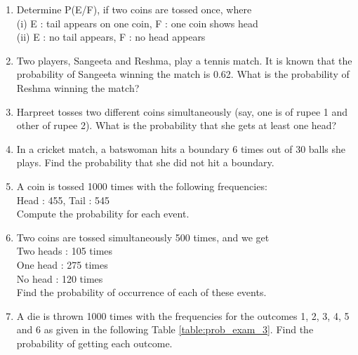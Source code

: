 \begin{enumerate}[label=\thesection.\arabic*.,ref=\thesection.\theenumi]
\item Determine P(E/F), if two coins are tossed once, where\\
(i) E : tail appears on one coin, F : one coin shows head\\
(ii) E : no tail appears, F : no head appears\\
\item Two players, Sangeeta and Reshma, play a tennis match. It is known
that the probability of Sangeeta winning the match is 0.62. What is the probability of
Reshma winning the match?
\item Harpreet tosses two different coins simultaneously (say, one is of rupee 1
and other of rupee 2). What is the probability that she gets at least one head?

	\item In a cricket match, a batswoman hits a boundary 6 times out of 30 balls she plays. Find the probability that she did not hit a boundary.
\\
\solution

	\item A coin is tossed 1000 times with the following frequencies:\\
Head : 455, Tail : 545\\
Compute the probability for each event.\\
\solution

   \item Two coins are tossed simultaneously 500 times, and we get\\
       Two heads : 105 times\\
       One head : 275 times\\
       No head : 120 times\\
Find the probability of occurrence of each of these events.\\
\solution

   \item A die is thrown 1000 times with the frequencies for the outcomes 1, 2, 3, 4, 5 and 6 as given in the following Table \ref{table:prob_exam_3}.
Find the probability of getting each outcome.

\begin{table}[!ht]
\centering
{}
\caption{}
\label{table:prob_exam_3}
\end{table}
\solution



\end{enumerate}
